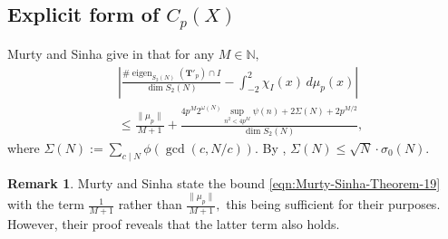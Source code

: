 \documentclass[11pt,letterpaper,reqno]{amsart}
\theoremstyle{definition}
\newtheorem{remark}[theorem]{Remark}
\numberwithin{equation}{section}
\numberwithin{figure}{section}
\numberwithin{table}{section}
\let\subsectiontemp\subsection
\renewcommand{\subsection}[1]{ 
    \subsectiontemp{#1} \hfill\vspace{0.5\linespacing} 
}
\begin{document}
\subsection{Explicit form of \texorpdfstring{$C_p(X)$}{Cp(X)}}\label{subsection:explicit-form-C}

Murty and Sinha give in \cite[Theorem 19]{MS07} that for any $M \in \mathbb{N},$
\begin{align}
    &\left|
\frac{\# \operatorname{eigen}_{S_2(N)}(\mathbf{T}'_p) \cap I}
{\dim S_2(N)}
-
\int_{-2}^2 \chi_I(x)\, d\mu_p(x)
\right| \\
&\leq \frac{\| \mu_p\|}{M + 1} + \frac{4p^M 2^{\omega(N)} \sup_{n^2 < 4p^M} \psi(n) + 2\Sigma(N) +  2p^{M/2}}{\dim S_2(N)}, \label{eqn:Murty-Sinha-Theorem-19}
\end{align}
where $ \Sigma(N) := \sum_{c \mid N} \phi(\gcd(c, N/c) ).$ By \cite[Page 696]{MS07}, $\Sigma(N) \leq\sqrt{N} \cdot \sigma_0(N)$.

\begin{remark}
    Murty and Sinha state the bound \eqref{eqn:Murty-Sinha-Theorem-19} with the term $\frac{1}{M + 1}$ rather than $\frac{\| \mu_p\|}{M + 1},$ this being sufficient for their purposes. However, their proof reveals that the latter term also holds.
\end{remark}
\end{document}
